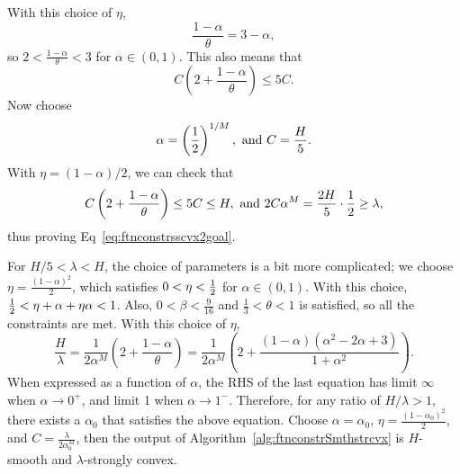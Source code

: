 With this choice of $\eta$,
\begin{equation*}
	\frac{1-\alpha}{\theta} = 3-\alpha,
\end{equation*}
so $2<\frac{1-\alpha}{\theta}<3$ for $\alpha \in (0,1)$.
This also means that
\begin{equation*}
	C\left ( 2 + \frac{1-\alpha}{\theta} \right) \leq 5C.
\end{equation*}
Now choose
\begin{equation*}
	\alpha = \left (\frac{1}{2} \right )^{1/M}, \text{ and } 
	C = \frac{H}{5}.
\end{equation*}
With $\eta = (1-\alpha)/2$, we can check that
\begin{equation*}
	C\left ( 2 + \frac{1-\alpha}{\theta} \right) \leq 5C \leq H, \text{ and }
	2C\alpha^M = \frac{2H}{5} \cdot \frac{1}{2}  \geq \lambda,
\end{equation*}
thus proving Eq~\eqref{eq:ftnconstrsscvx2goal}.

For $H/5 < \lambda < H$, the choice of parameters is a bit more complicated;
we choose $\eta = \frac{(1-\alpha)^2}{2}$, which satisfies $0< \eta < \frac{1}{2}$ for $\alpha \in (0,1)$.
With this choice, $\frac{1}{2} < \eta + \alpha + \eta\alpha < 1$. Also, $0<\beta<\frac{9}{16}$ and $\frac{1}{3} < \theta < 1$ is satisfied, so all the constraints are met.
With this choice of $\eta$,
\begin{equation*}
	\frac{H}{\lambda}
	= \frac{1}{2\alpha^M} \left ( 2 + \frac{1-\alpha}{\theta} \right) 
	= \frac{1}{2\alpha^M} \left ( 2 + \frac{(1-\alpha)(\alpha^2-2\alpha+3)}{1+\alpha^2} \right).
\end{equation*}
When expressed as a function of $\alpha$, the RHS of the last equation has limit $\infty$ when $\alpha \rightarrow 0^+$, and limit 1 when $\alpha \rightarrow 1^-$. Therefore, for any ratio of $H/\lambda>1$, there exists a $\alpha_0$ that satisfies the above equation.
Choose $\alpha = \alpha_0$, $\eta = \frac{(1-\alpha_0)^2}{2}$, and $C = \frac{\lambda}{2\alpha_0^M}$, then the output of Algorithm~\ref{alg:ftnconstrSmthstrcvx}
is $H$-smooth and $\lambda$-strongly convex.

